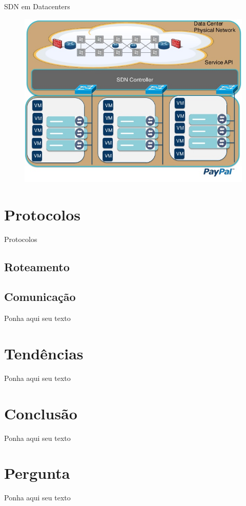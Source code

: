 \documentclass[aspectratio=169]{beamer}
\begin{document}
	\begin{frame} {SDN em Datacenters}
		\begin{figure}[ht]   
			\includegraphics[scale=0.4]{imagens/sdn-3.jpg}
			\label{fig:sample_figure}
		\end{figure}
	\end{frame}

\section{Protocolos}{Protocolos}
	\subsection{Roteamento}
	\subsection{Comunicação}
			
	\begin{frame} 
		Ponha aqui seu texto
	\end{frame}

\section{Tendências}
	\begin{frame} 
		Ponha aqui seu texto
	\end{frame}

\section{Conclusão}
	\begin{frame} 
		Ponha aqui seu texto
	\end{frame}
		
\section{Pergunta}
	\begin{frame} 
		Ponha aqui seu texto
	\end{frame}
	
\end{document}
